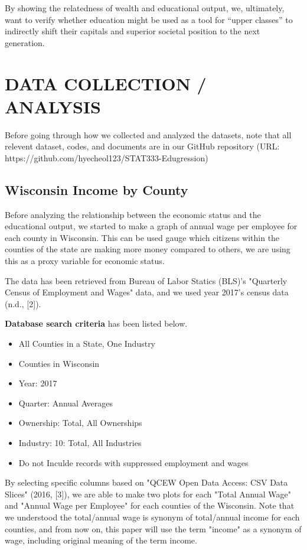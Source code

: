 \documentclass[letterpaper, 10 pt, conference]{ieeeconf}  %
\begin{document}
By showing the relatedness of wealth and educational output, we, ultimately, want to verify whether education might be used as a tool for “upper classes” to indirectly shift their capitals and superior societal position to the next generation.

\section{DATA COLLECTION / ANALYSIS}

Before going through how we collected and analyzed the datasets, note that all relevent dataset, codes, and documents are in our GitHub repository (URL: https://github.com/hyecheol123/STAT333-Edugression)

\subsection{Wisconsin Income by County}

Before analyzing the relationship between the economic status and the educational output, we started to make a graph of annual wage per employee for each county in Wisconsin.
This can be used gauge which citizens within the counties of the state are making more money compared to others, we are using this as a proxy variable for economic status.

The data has been retrieved from Bureau of Labor Statics (BLS)'s "Quarterly Census of Employment and Wages" data, and we used year 2017's census data (n.d., [2]).

\textbf{Database search criteria} has been listed below.

\begin{itemize}

\item All Counties in a State, One Industry
\item Counties in Wisconsin
\item Year: 2017
\item Quarter: Annual Averages
\item Ownership: Total, All Ownerships
\item Industry: 10: Total, All Industries
\item Do not Inculde records with suppressed employment and wages

\end{itemize}
\vspace{1\baselineskip}

By selecting specific columns based on "QCEW Open Data Access: CSV Data Slices" (2016, [3]), we are able to make two plots for each "Total Annual Wage" and "Annual Wage per Employee" for each counties of the Wisconsin.
Note that we understood the total/annual wage is synonym of total/annual income for each counties, and from now on, this paper will use the term "income" as a synonym of wage, including original meaning of the term income.
\end{document}
